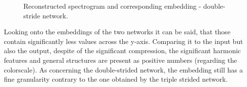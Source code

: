 \begin{figure}[htb!]
    \centering
    \captionsetup{justification=centering}
    \caption{Reconstructed spectrogram and corresponding embedding - double-stride network.}
    \label{fig:res_double_str_2D_output_emb}
\end{figure}

Looking onto the embeddings of the two networks it can be said, that those contain significantly less values across the y-axis. Comparing it to the input but also the output, despite of the significant compression, the significant harmonic features and general structures are present as positive numbers (regarding the colorscale). As concerning the double-strided network, the embedding still has a fine granularity contrary to the one obtained by the triple strided network.

